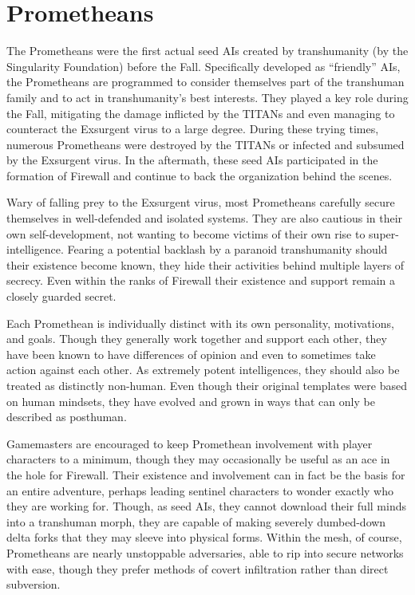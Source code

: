 \section{Prometheans }

The Prometheans were the first actual seed AIs created
by transhumanity (by the Singularity Foundation)
before the Fall. Specifically developed as ``friendly'' 
AIs, the Prometheans are programmed to consider 
themselves part of the transhuman family and to act 
in transhumanity's best interests. They played a key 
role during the Fall, mitigating the damage inflicted 
by the TITANs and even managing to counteract the 
Exsurgent virus to a large degree. During these trying 
times, numerous Prometheans were destroyed by the 
TITANs or infected and subsumed by the Exsurgent 
virus. In the aftermath, these seed AIs participated in 
the formation of Firewall and continue to back the 
organization behind the scenes.

Wary of falling prey to the Exsurgent virus, most 
Prometheans carefully secure themselves in well-defended
and isolated systems. They are also cautious
in their own self-development, not wanting to become 
victims of their own rise to super-intelligence. Fearing
a potential backlash by a paranoid transhumanity
should their existence become known, they hide
their activities behind multiple layers of secrecy. Even 
within the ranks of Firewall their existence and support
remain a closely guarded secret.

Each Promethean is individually distinct with its 
own personality, motivations, and goals. Though they 
generally work together and support each other, they 
have been known to have differences of opinion and 
even to sometimes take action against each other. As 
extremely potent intelligences, they should also be 
treated as distinctly non-human. Even though their 
original templates were based on human mindsets, 
they have evolved and grown in ways that can only 
be described as posthuman. 

Gamemasters are encouraged to keep Promethean 
involvement with player characters to a minimum, 
though they may occasionally be useful as an ace in 
the hole for Firewall. Their existence and involvement
can in fact be the basis for an entire adventure,
perhaps leading sentinel characters to wonder exactly 
who they are working for. Though, as seed AIs, they 
cannot download their full minds into a transhuman 
morph, they are capable of making severely dumbed-down
delta forks that they may sleeve into physical
forms. Within the mesh, of course, Prometheans are 
nearly unstoppable adversaries, able to rip into secure 
networks with ease, though they prefer methods of 
covert infiltration rather than direct subversion.

